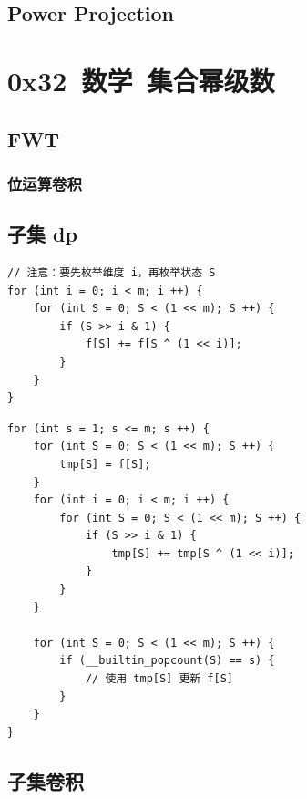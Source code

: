 \documentclass{article}
\begin{document}

\subsection{Power Projection}


\section{0x32\ 数学\ 集合幂级数}

\subsection{FWT}

\subsubsection{位运算卷积}


\subsection{子集 dp}

\begin{verbatim}
// 注意：要先枚举维度 i，再枚举状态 S
for (int i = 0; i < m; i ++) {
    for (int S = 0; S < (1 << m); S ++) {
        if (S >> i & 1) {
            f[S] += f[S ^ (1 << i)];
        }
    }
}
\end{verbatim}

\begin{verbatim}
for (int s = 1; s <= m; s ++) {
    for (int S = 0; S < (1 << m); S ++) {
        tmp[S] = f[S];
    }
    for (int i = 0; i < m; i ++) {
        for (int S = 0; S < (1 << m); S ++) {
            if (S >> i & 1) {
                tmp[S] += tmp[S ^ (1 << i)];
            }
        }
    }
    
    for (int S = 0; S < (1 << m); S ++) {
        if (__builtin_popcount(S) == s) {
            // 使用 tmp[S] 更新 f[S]
        }
    }
}
\end{verbatim}

\subsection{子集卷积}
\end{document}
